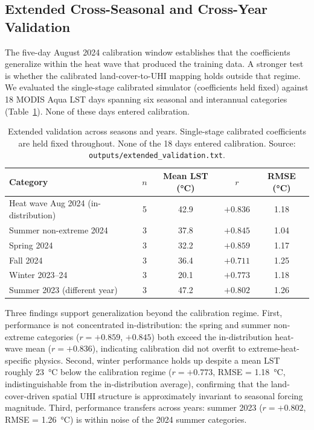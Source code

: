 \documentclass[12pt, letterpaper]{article}
\begin{document}
\subsection{Extended Cross-Seasonal and Cross-Year Validation}
\label{sec:extended_validation}

The five-day August 2024 calibration window establishes that the coefficients
generalize within the heat wave that produced the training data. A stronger
test is whether the calibrated land-cover-to-UHI mapping holds outside that
regime. We evaluated the single-stage calibrated simulator (coefficients held
fixed) against 18 MODIS Aqua LST days spanning six seasonal and interannual
categories (Table~\ref{tab:extended_validation}). None of these days
entered calibration.

\begin{table}[ht]
  \centering
  \caption{Extended validation across seasons and years. Single-stage
  calibrated coefficients are held fixed throughout. None of the 18 days
  entered calibration. Source: \texttt{outputs/extended\_validation.txt}.}
  \label{tab:extended_validation}
  \begin{tabular}{lcccc}
    \toprule
    Category & $n$ & Mean LST (°C) & $r$ & RMSE (°C) \\
    \midrule
    Heat wave Aug 2024 (in-distribution) & 5 & 42.9 & $+0.836$ & 1.18 \\
    Summer non-extreme 2024              & 3 & 37.8 & $+0.845$ & 1.04 \\
    Spring 2024                          & 3 & 32.2 & $+0.859$ & 1.17 \\
    Fall 2024                            & 3 & 36.4 & $+0.711$ & 1.25 \\
    Winter 2023--24                      & 3 & 20.1 & $+0.773$ & 1.18 \\
    Summer 2023 (different year)         & 3 & 47.2 & $+0.802$ & 1.26 \\
    \bottomrule
  \end{tabular}
\end{table}

Three findings support generalization beyond the calibration regime.
First, performance is not concentrated in-distribution: the spring and
summer non-extreme categories ($r = +0.859$, $+0.845$) both exceed the
in-distribution heat-wave mean ($r = +0.836$), indicating calibration did
not overfit to extreme-heat-specific physics. Second, winter performance
holds up despite a mean LST roughly \SI{23}{\degreeCelsius} below the
calibration regime ($r = +0.773$, RMSE = \SI{1.18}{\degreeCelsius},
indistinguishable from the in-distribution average), confirming that the
land-cover-driven spatial UHI structure is approximately invariant to
seasonal forcing magnitude. Third, performance transfers across years:
summer 2023 ($r = +0.802$, RMSE = \SI{1.26}{\degreeCelsius}) is within
noise of the 2024 summer categories.
\end{document}
